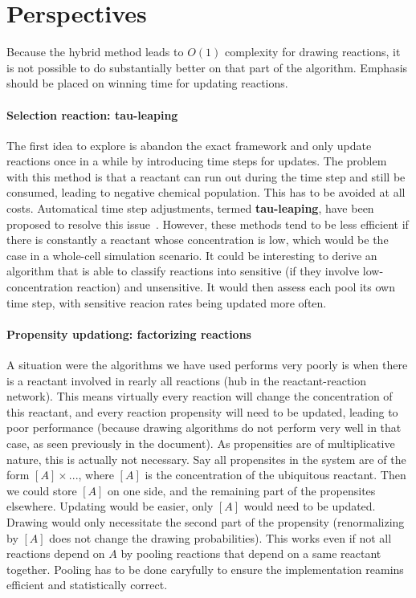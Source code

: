 \section {Perspectives}

Because the hybrid method leads to $O(1)$ complexity for drawing reactions, it is not possible to do substantially better on that part of the algorithm. Emphasis should be placed on winning time for updating reactions.

\paragraph{Selection reaction: tau-leaping} The first idea to explore is abandon the exact framework and only update reactions once in a while by introducing time steps for updates. The problem with this method is that a reactant can run out during the time step and still be consumed, leading to negative chemical population. This has to be avoided at all costs. Automatical time step adjustments, termed \textbf{tau-leaping}, have been proposed to resolve this issue~\citep{mimi}. However, these methods tend to be less efficient if there is constantly a reactant whose concentration is low, which would be the case in a whole-cell simulation scenario. It could be interesting to derive an algorithm that is able to classify reactions into sensitive (if they involve low-concentration reaction) and unsensitive. It would then assess each pool its own time step, with sensitive reacion rates being updated more often.

\paragraph{Propensity updationg: factorizing reactions} A situation were the algorithms we have used performs very poorly is when there is a reactant involved in rearly all reactions (hub in the reactant-reaction network). This means virtually every reaction will change the concentration of this reactant, and every reaction propensity will need to be updated, leading to poor performance (because drawing algorithms do not perform very well in that case, as seen previously in the document). As propensities are of multiplicative nature, this is actually not necessary. Say all propensites in the system are of the form $[A]\times ...$, where $[A]$ is the concentration of the ubiquitous reactant. Then we could store $[A]$ on one side, and the remaining part of the propensites elsewhere. Updating would be easier, only $[A]$ would need to be updated. Drawing would only necessitate the second part of the propensity (renormalizing by $[A]$ does not change the drawing probabilities). This works even if not all reactions depend on $A$ by pooling reactions that depend on a same reactant together. Pooling has to be done caryfully to ensure the implementation reamins efficient and statistically correct.

